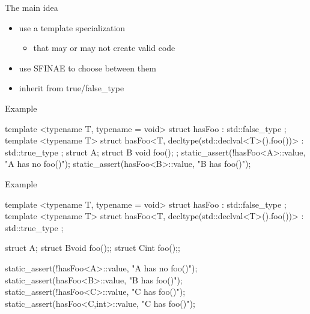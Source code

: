 \begin{frame}[fragile]
  \begin{block}{The main idea}
    \begin{itemize}
    \item use a template specialization
      \begin{itemize}
      \item that may or may not create valid code
      \end{itemize}
    \item use SFINAE to choose between them
    \item inherit from true/false\_type
    \end{itemize}
  \end{block}
  \begin{exampleblock}{Example}
    \small
    \begin{cppcode*}{}
      template <typename T, typename = void>
      struct hasFoo : std::false_type {};
      template <typename T>
      struct hasFoo<T, decltype(std::declval<T>().foo())>
        : std::true_type {};
      struct A{}; struct B{ void foo(); };
      static_assert(!hasFoo<A>::value, "A has no foo()");
      static_assert(hasFoo<B>::value, "B has foo()");
    \end{cppcode*}
  \end{exampleblock}
\end{frame}

\begin{frame}[fragile]
  \begin{exampleblock}{Example}
    \small
    \begin{cppcode*}{}
      template <typename T, typename = void>
      struct hasFoo : std::false_type {};
      template <typename T>
      struct hasFoo<T, decltype(std::declval<T>().foo())>
        : std::true_type {};

      struct A{};
      struct B{void foo();};
      struct C{int foo();};

      static_assert(!hasFoo<A>::value, "A has no foo()");
      static_assert(hasFoo<B>::value, "B has foo()");
      static_assert(!hasFoo<C>::value, "C has foo()");
      static_assert(hasFoo<C,int>::value, "C has foo()");
    \end{cppcode*}
  \end{exampleblock}
\end{frame}

